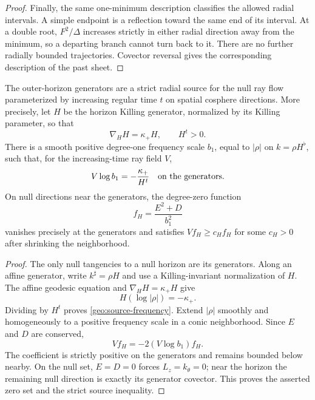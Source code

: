 \begin{proof}
Finally, the same one-minimum description classifies the allowed radial
intervals.  A simple endpoint is a reflection toward the same end of its
interval.  At a double root, $F^2/\Delta$ increases strictly in either
radial direction away from the minimum, so a departing branch cannot
turn back to it.  There are no further radially bounded trajectories.
Covector reversal gives the corresponding description of the past
sheet.
\end{proof}

\begin{lemma}
\label{geo:horizon-source}
The outer-horizon generators are a strict radial source for the null
ray flow parameterized by increasing regular time $t$ on spatial
cosphere directions.  More precisely, let $H$ be the horizon Killing
generator, normalized by its Killing parameter, so that
\[
 \nabla_HH=\kappa_+H,\qquad H^t>0.
\]
There is a smooth positive degree-one frequency scale $b_1$, equal to
$|\rho|$ on $k=\rho H^\flat$, such that, for the increasing-time ray
field $V$,
\begin{equation}
 V\log b_1=-\frac{\kappa_+}{H^t}
       \quad\hbox{on the generators}.
 \label{geo:source-frequency}
\end{equation}
On null directions near the generators, the degree-zero function
\begin{equation}
 f_H=\frac{E^2+D}{b_1^2}
 \label{geo:source-function}
\end{equation}
vanishes precisely at the generators and satisfies
$Vf_H\geq c_H f_H$ for some $c_H>0$ after shrinking the neighborhood.
\end{lemma}

\begin{proof}
The only null tangencies to a null horizon are its generators.
Along an affine generator, write $k^\sharp=\rho H$ and use a
Killing-invariant normalization of $H$.  The affine geodesic equation
and $\nabla_HH=\kappa_+H$ give
\[
 H(\log|\rho|)=-\kappa_+.
\]
Dividing by $H^t$ proves \eqref{geo:source-frequency}.  Extend
$|\rho|$ smoothly and homogeneously to a positive frequency scale in a
conic neighborhood.  Since $E$ and $D$ are conserved,
\[
 Vf_H=-2(V\log b_1)f_H.
\]
The coefficient is strictly positive on the generators and remains
bounded below nearby.  On the null set, $E=D=0$ forces
$L_z=k_\theta=0$; near the horizon the remaining null direction is
exactly its generator covector.  This proves the asserted zero set
and the strict source inequality.
\end{proof}

